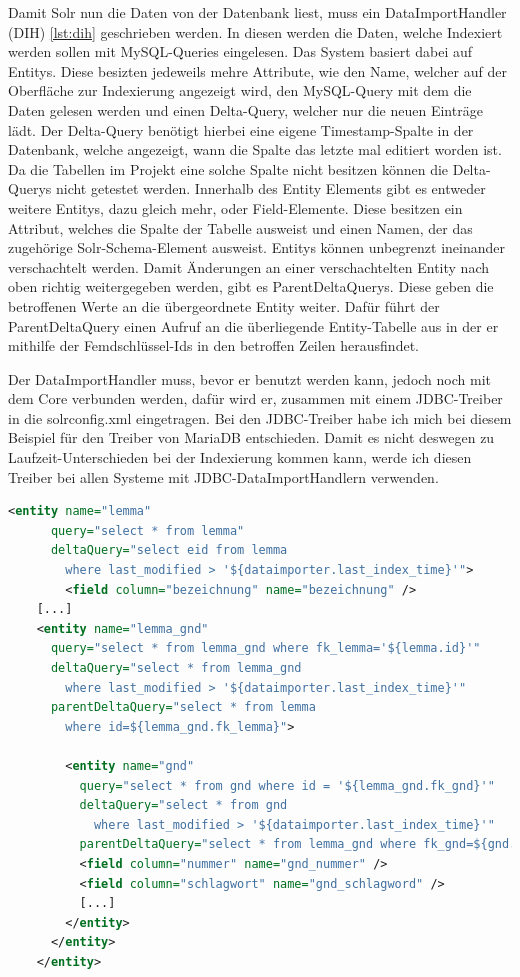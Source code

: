 Damit Solr nun die Daten von der Datenbank liest, muss ein DataImportHandler (DIH) \ref{lst:dih} geschrieben werden. In diesen werden die Daten, welche Indexiert werden sollen mit MySQL-Queries eingelesen. Das System basiert dabei auf Entitys. Diese besizten jedeweils mehre Attribute, wie den Name, welcher auf der Oberfläche zur Indexierung angezeigt wird, den MySQL-Query mit dem die Daten gelesen werden und einen Delta-Query, welcher nur die neuen Einträge lädt. Der Delta-Query benötigt hierbei eine eigene Timestamp-Spalte in der Datenbank, welche angezeigt, wann die Spalte das letzte mal editiert worden ist. Da die Tabellen im Projekt eine solche Spalte nicht besitzen können die Delta-Querys nicht getestet werden. Innerhalb des Entity Elements gibt es entweder weitere Entitys, dazu gleich mehr, oder Field-Elemente. Diese besitzen ein Attribut, welches die Spalte der Tabelle ausweist und einen Namen, der das zugehörige Solr-Schema-Element ausweist. 
Entitys können unbegrenzt ineinander verschachtelt werden. Damit Änderungen an einer verschachtelten Entity nach oben richtig weitergegeben werden, gibt es ParentDeltaQuerys. Diese geben die betroffenen Werte an die übergeordnete Entity weiter. Dafür führt der ParentDeltaQuery einen Aufruf an die überliegende Entity-Tabelle aus in der er mithilfe der Femdschlüssel-Ids in den betroffen Zeilen herausfindet.

Der DataImportHandler muss, bevor er benutzt werden kann, jedoch noch mit dem Core verbunden werden, dafür wird er, zusammen mit einem JDBC-Treiber in die solrconfig.xml eingetragen. Bei den JDBC-Treiber habe ich mich bei diesem Beispiel für den Treiber von MariaDB entschieden. Damit es nicht deswegen zu Laufzeit-Unterschieden bei der Indexierung kommen kann, werde ich diesen Treiber bei allen Systeme mit JDBC-DataImportHandlern verwenden.

\begin{lstlisting}[language=xml, frame=single, label={lst:dih}, 
    morekeywords={entity,query,deltaQuery,parentDeltaQuery,field,column, name}] 
    <entity name="lemma" 
      query="select * from lemma" 
      deltaQuery="select eid from lemma 
        where last_modified > '${dataimporter.last_index_time}'"> 
		<field column="bezeichnung" name="bezeichnung" />
    [...]
    <entity name="lemma_gnd" 
      query="select * from lemma_gnd where fk_lemma='${lemma.id}'"
      deltaQuery="select * from lemma_gnd 
        where last_modified > '${dataimporter.last_index_time}'"
      parentDeltaQuery="select * from lemma 
        where id=${lemma_gnd.fk_lemma}">
			
        <entity name="gnd" 
          query="select * from gnd where id = '${lemma_gnd.fk_gnd}'"
          deltaQuery="select * from gnd 
            where last_modified > '${dataimporter.last_index_time}'"
          parentDeltaQuery="select * from lemma_gnd where fk_gnd=${gnd.id}">
          <field column="nummer" name="gnd_nummer" />
          <field column="schlagwort" name="gnd_schlagword" />
          [...]
        </entity>
      </entity>  
    </entity>
\end{lstlisting}


